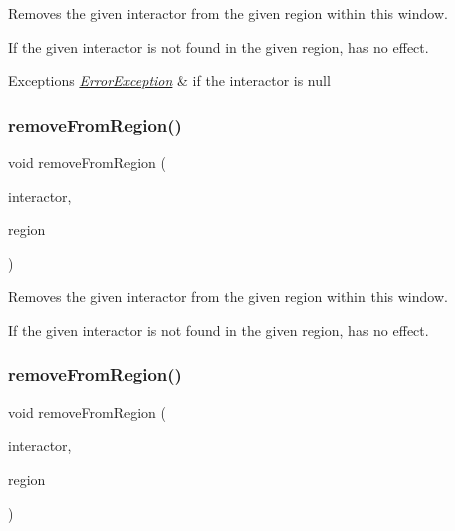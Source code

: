 Removes the given interactor from the given region within this window. 

If the given interactor is not found in the given region, has no effect. 
\begin{DoxyExceptions}{Exceptions}
{\em \mbox{\hyperlink{classErrorException}{Error\+Exception}}} & if the interactor is null \\
\hline
\end{DoxyExceptions}
\mbox{\label{classGWindow_afee7b65f917c4f6a0fdb1c8ea75406a5}} 
\subsubsection{\texorpdfstring{remove\+From\+Region()}{removeFromRegion()}\hspace{0.1cm}{\footnotesize\ttfamily [3/4]}}
{\footnotesize\ttfamily void remove\+From\+Region (\begin{DoxyParamCaption}\item[{\mbox{\hyperlink{classGInteractor}{G\+Interactor}} \&}]{interactor,  }\item[{\mbox{\hyperlink{classGWindow_a81a01a86de31071a92e6cce0bab9bc4b}{Region}}}]{region }\end{DoxyParamCaption})\hspace{0.3cm}{\ttfamily [virtual]}}



Removes the given interactor from the given region within this window. 

If the given interactor is not found in the given region, has no effect. \mbox{\label{classGWindow_af7a055c83c0e0e3f3722596d7111fcbe}} 
\subsubsection{\texorpdfstring{remove\+From\+Region()}{removeFromRegion()}\hspace{0.1cm}{\footnotesize\ttfamily [4/4]}}
{\footnotesize\ttfamily void remove\+From\+Region (\begin{DoxyParamCaption}\item[{\mbox{\hyperlink{classGInteractor}{G\+Interactor}} \&}]{interactor,  }\item[{const std\+::string \&}]{region }\end{DoxyParamCaption})\hspace{0.3cm}{\ttfamily [virtual]}}



